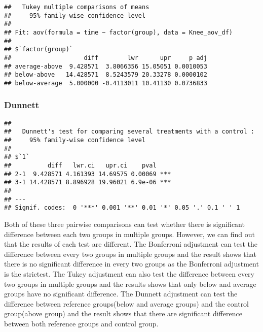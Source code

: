 \documentclass[]{article}
\newenvironment{Shaded}{\begin{snugshade}}{\end{snugshade}}
\newcommand{\KeywordTok}[1]{\textcolor[rgb]{0.13,0.29,0.53}{\textbf{#1}}}
\newcommand{\DataTypeTok}[1]{\textcolor[rgb]{0.13,0.29,0.53}{#1}}
\newcommand{\StringTok}[1]{\textcolor[rgb]{0.31,0.60,0.02}{#1}}
\newcommand{\OperatorTok}[1]{\textcolor[rgb]{0.81,0.36,0.00}{\textbf{#1}}}
\newcommand{\NormalTok}[1]{#1}
\begin{document}
\begin{Shaded}
\end{Shaded}

\begin{verbatim}
##   Tukey multiple comparisons of means
##     95% family-wise confidence level
## 
## Fit: aov(formula = time ~ factor(group), data = Knee_aov_df)
## 
## $`factor(group)`
##                    diff        lwr      upr     p adj
## average-above  9.428571  3.8066356 15.05051 0.0010053
## below-above   14.428571  8.5243579 20.33278 0.0000102
## below-average  5.000000 -0.4113011 10.41130 0.0736833
\end{verbatim}

\subsubsection{Dunnett}\label{dunnett}

\begin{Shaded}
\end{Shaded}

\begin{verbatim}
## 
##   Dunnett's test for comparing several treatments with a control :  
##     95% family-wise confidence level
## 
## $`1`
##          diff   lwr.ci   upr.ci    pval    
## 2-1  9.428571 4.161393 14.69575 0.00069 ***
## 3-1 14.428571 8.896928 19.96021 6.9e-06 ***
## 
## ---
## Signif. codes:  0 '***' 0.001 '**' 0.01 '*' 0.05 '.' 0.1 ' ' 1
\end{verbatim}

Both of these three pairwise comparisons can test whether there is
significant difference between each two groups in multiple groups.
However, we can find out that the results of each test are different.
The Bonferroni adjustment can test the difference between every two
groups in multiple groups and the result shows that there is no
significant difference in every two groups as the Bonferroni adjustment
is the strictest. The Tukey adjustment can also test the difference
between every two groups in multiple groups and the results shows that
only below and average groups have no significant difference. The
Dunnett adjustment can test the difference between reference
groups(below and average groups) and the control group(above group) and
the result shows that there are significant difference between both
reference groups and control group.
\end{document}
